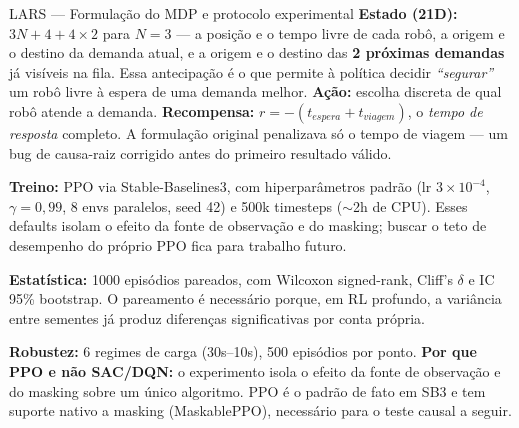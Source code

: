 \documentclass[aspectratio=169]{beamer}
\begin{document}
\begin{frame}{LARS — Formulação do MDP e protocolo experimental}
\scriptsize
\textbf{Estado (21D):} $3N+4+4\times2$ para $N=3$ — a posição e o tempo livre de cada robô, a origem e o destino da demanda atual, e a origem e o destino das \textbf{2 próximas demandas} já visíveis na fila. Essa antecipação é o que permite à política decidir \emph{``segurar''} um robô livre à espera de uma demanda melhor. \textbf{Ação:} escolha discreta de qual robô atende a demanda. \textbf{Recompensa:} $r = -(t_{espera}+t_{viagem})$, o \emph{tempo de resposta} completo. A formulação original penalizava só o tempo de viagem — um bug de causa-raiz corrigido antes do primeiro resultado válido.

\vspace{0.2cm}
\textbf{Treino:} PPO via Stable-Baselines3, com hiperparâmetros padrão (lr $3\times10^{-4}$, $\gamma=0,99$, 8 envs paralelos, seed 42) e 500k timesteps ($\sim$2h de CPU). Esses defaults isolam o efeito da fonte de observação e do masking; buscar o teto de desempenho do próprio PPO fica para trabalho futuro.

\textbf{Estatística:} 1000 episódios pareados, com Wilcoxon signed-rank, Cliff's $\delta$ e IC 95\% bootstrap. O pareamento é necessário porque, em RL profundo, a variância entre sementes já produz diferenças significativas por conta própria.

\textbf{Robustez:} 6 regimes de carga (30s–10s), 500 episódios por ponto. \textbf{Por que PPO e não SAC/DQN:} o experimento isola o efeito da fonte de observação e do masking sobre um único algoritmo. PPO é o padrão de fato em SB3 e tem suporte nativo a masking (MaskablePPO), necessário para o teste causal a seguir.
\end{frame}
\end{document}
